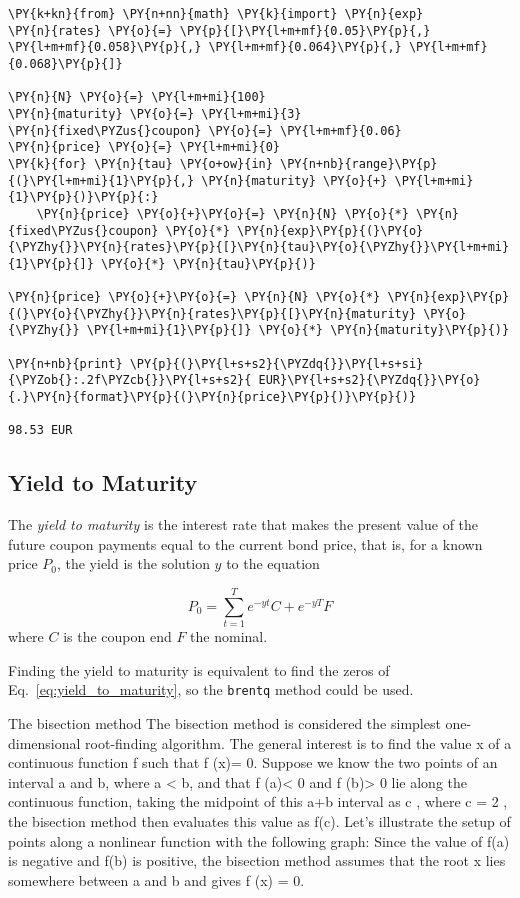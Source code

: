 \begin{codebox}
\begin{Verbatim}[commandchars=\\\{\}]
\PY{k+kn}{from} \PY{n+nn}{math} \PY{k}{import} \PY{n}{exp}
\PY{n}{rates} \PY{o}{=} \PY{p}{[}\PY{l+m+mf}{0.05}\PY{p}{,} \PY{l+m+mf}{0.058}\PY{p}{,} \PY{l+m+mf}{0.064}\PY{p}{,} \PY{l+m+mf}{0.068}\PY{p}{]}

\PY{n}{N} \PY{o}{=} \PY{l+m+mi}{100}
\PY{n}{maturity} \PY{o}{=} \PY{l+m+mi}{3}
\PY{n}{fixed\PYZus{}coupon} \PY{o}{=} \PY{l+m+mf}{0.06}
\PY{n}{price} \PY{o}{=} \PY{l+m+mi}{0}
\PY{k}{for} \PY{n}{tau} \PY{o+ow}{in} \PY{n+nb}{range}\PY{p}{(}\PY{l+m+mi}{1}\PY{p}{,} \PY{n}{maturity} \PY{o}{+} \PY{l+m+mi}{1}\PY{p}{)}\PY{p}{:}
    \PY{n}{price} \PY{o}{+}\PY{o}{=} \PY{n}{N} \PY{o}{*} \PY{n}{fixed\PYZus{}coupon} \PY{o}{*} \PY{n}{exp}\PY{p}{(}\PY{o}{\PYZhy{}}\PY{n}{rates}\PY{p}{[}\PY{n}{tau}\PY{o}{\PYZhy{}}\PY{l+m+mi}{1}\PY{p}{]} \PY{o}{*} \PY{n}{tau}\PY{p}{)}

\PY{n}{price} \PY{o}{+}\PY{o}{=} \PY{n}{N} \PY{o}{*} \PY{n}{exp}\PY{p}{(}\PY{o}{\PYZhy{}}\PY{n}{rates}\PY{p}{[}\PY{n}{maturity} \PY{o}{\PYZhy{}} \PY{l+m+mi}{1}\PY{p}{]} \PY{o}{*} \PY{n}{maturity}\PY{p}{)}
    
\PY{n+nb}{print} \PY{p}{(}\PY{l+s+s2}{\PYZdq{}}\PY{l+s+si}{\PYZob{}:.2f\PYZcb{}}\PY{l+s+s2}{ EUR}\PY{l+s+s2}{\PYZdq{}}\PY{o}{.}\PY{n}{format}\PY{p}{(}\PY{n}{price}\PY{p}{)}\PY{p}{)}

98.53 EUR
\end{Verbatim}
\end{codebox}

\subsection{Yield to Maturity}
The \emph{yield to maturity} is the interest rate that makes the present value of the future coupon payments equal to the current bond price, that is, for a known price $P_0$, the yield is the solution $y$ to the equation

\begin{equation}
	P_0 = \sum_{t=1}^T e^{-yt}C + e^{-yT}F 
\label{eq:yield_to_maturity}
\end{equation}
where $C$ is the coupon end $F$ the nominal.

Finding the yield to maturity is equivalent to find the zeros of Eq.~\ref{eq:yield_to_maturity}, so the \texttt{brentq} method could be used.


The bisection method
The bisection method is considered the simplest one-dimensional root-finding algorithm. The general interest is to find the value x of a continuous function f such that f (x)= 0.
Suppose we know the two points of an interval a and b, where a < b, and that
f (a)< 0 and f (b)> 0 lie along the continuous function, taking the midpoint of this
a+b
interval as c , where c = 2 , the bisection method then evaluates this value as f(c).
Let's illustrate the setup of points along a nonlinear function with the following graph:
Since the value of f(a) is negative and f(b) is positive, the bisection method assumes that the root x lies somewhere between a and b and gives f (x) = 0.

